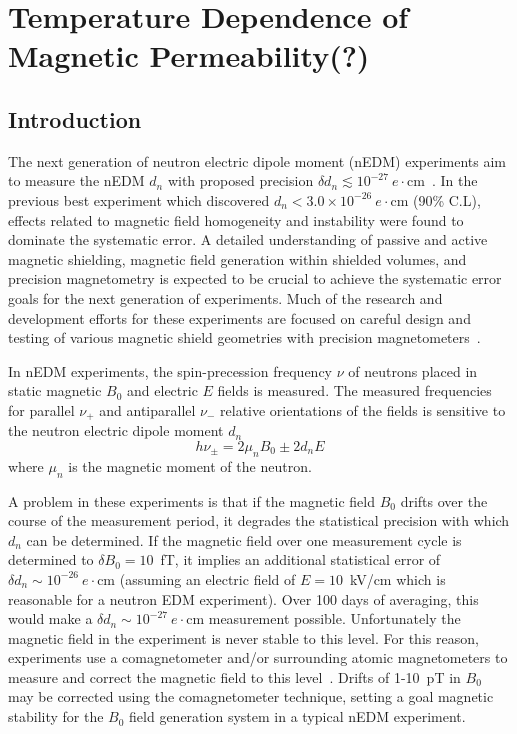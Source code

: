 \chapter{Temperature Dependence of Magnetic Permeability(?)}


\section{Introduction}

The next generation of neutron electric dipole moment (nEDM)
experiments aim to measure the nEDM $d_n$ with proposed precision
$\delta d_n\lesssim
10^{-27}~e\cdot$cm~\cite{serebrov2014new,serebrov2011supersource,Kirch_talk,baker2011search,altarev2012next,golub1994neutron,ito2007plans,picker2017minuscule}.
In the previous best experiment \cite{baker2006,Pendlebury2015} which
discovered $d_n<3.0\times 10^{-26}~e\cdot$cm (90\% C.L), effects
related to magnetic field homogeneity and instability were found to
dominate the systematic error.  A detailed understanding of passive
and active magnetic shielding, magnetic field generation within
shielded volumes, and precision magnetometry is expected to be crucial
to achieve the systematic error goals for the next generation of
experiments.  Much of the research and development efforts for these
experiments are focused on careful design and testing of various
magnetic shield geometries with precision
magnetometers~\cite{brys2005magnetic,afach2014dynamic,altarev2014magnetically,Sturm_thesis,patton2014all}.

In nEDM experiments, the spin-precession frequency $\nu$ of neutrons
placed in static magnetic $B_0$ and electric $E$ fields is measured.
The measured frequencies for parallel $\nu_+$ and antiparallel $\nu_-$
relative orientations of the fields is sensitive to the neutron
electric dipole moment $d_n$
\begin{equation}
h\nu_\pm=2\mu_nB_0\pm 2d_nE
\end{equation}
where $\mu_n$ is the magnetic moment of the neutron.

A problem in these experiments is that if the magnetic field $B_0$
drifts over the course of the measurement period, it degrades the
statistical precision with which $d_n$ can be determined.  If the
magnetic field over one measurement cycle is determined to
$\delta B_0=10$~fT, it implies an additional statistical error of
$\delta d_n\sim 10^{-26}~e\cdot$cm (assuming an electric field of
$E=10$~kV/cm which is reasonable for a neutron EDM experiment).  Over
100 days of averaging, this would make a
$\delta d_n\sim 10^{-27}~e\cdot$cm measurement possible.
Unfortunately the magnetic field in the experiment is never stable to
this level.  For this reason, experiments use a comagnetometer and/or
surrounding atomic magnetometers to measure and correct the magnetic
field to this
level~\cite{baker2006,brys2005magnetic,afach2014dynamic}.  Drifts of
1-10~pT in $B_0$ may be corrected using the comagnetometer technique,
setting a goal magnetic stability for the $B_0$ field generation
system in a typical nEDM experiment.

